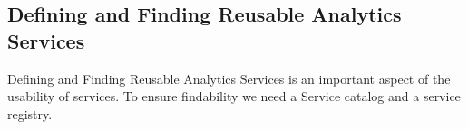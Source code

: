 
\subsection{Defining and Finding Reusable Analytics Services}
\label{sec:defining}

Defining and Finding Reusable Analytics Services is an important
aspect of the usability of services. To ensure findability we need a
Service catalog and a service registry.

